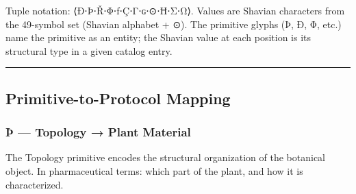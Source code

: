 \documentclass[12pt,a4paper]{article}
\begin{document}
Tuple notation: ⟨Ð⋅Þ⋅Ř⋅Φ⋅ƒ⋅Ç⋅Γ⋅ɢ⋅⊙⋅Ħ⋅Σ⋅Ω⟩. Values are Shavian characters
from the 49-symbol set (Shavian alphabet + ⊙). The primitive glyphs (Þ,
Ð, Φ, etc.) name the primitive as an entity; the Shavian value at each
position is its structural type in a given catalog entry.

\begin{center}\rule{0.5\linewidth}{0.5pt}\end{center}

\hypertarget{primitive-to-protocol-mapping}{%
\subsection{Primitive-to-Protocol
Mapping}\label{primitive-to-protocol-mapping}}

\hypertarget{uxfe-topology-plant-material}{%
\subsubsection{Þ --- Topology → Plant
Material}\label{uxfe-topology-plant-material}}

The Topology primitive encodes the structural organization of the
botanical object. In pharmaceutical terms: which part of the plant, and
how it is characterized.
\end{document}

